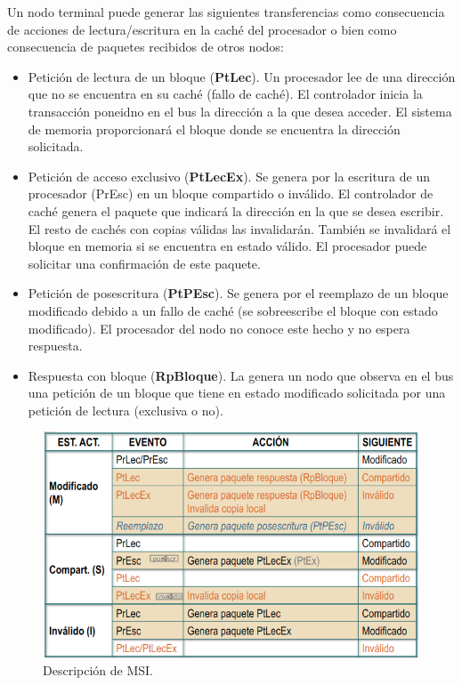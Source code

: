 \documentclass[12pt,spanish]{article}
\begin{document}
Un nodo terminal puede generar las siguientes transferencias como consecuencia de acciones de lectura/escritura en la caché del procesador o bien como consecuencia de paquetes recibidos de otros nodos:

\begin{itemize}
	\item Petición de lectura de un bloque (\textbf{PtLec}). Un procesador lee de una dirección que no se encuentra en su caché (fallo de caché). El controlador inicia la transacción poneidno en el bus la dirección a la que desea acceder. El sistema de memoria proporcionará el bloque donde se encuentra la dirección solicitada.
	\item Petición de acceso exclusivo (\textbf{PtLecEx}). Se genera por la escritura de un procesador (PrEsc) en un bloque compartido o inválido. El controlador de caché genera el paquete que indicará la dirección en la que se desea escribir. El resto de cachés con copias válidas las invalidarán. También se invalidará el bloque en memoria si se encuentra en estado válido. El procesador puede solicitar una confirmación de este paquete.
	\item Petición de posescritura (\textbf{PtPEsc}). Se genera por el reemplazo de un bloque modificado debido a un fallo de caché (se sobreescribe el bloque con estado modificado). El procesador del nodo no conoce este hecho y no espera respuesta.
	\item Respuesta con bloque (\textbf{RpBloque}). La genera un nodo que observa en el bus una petición de un bloque que tiene en estado modificado solicitada por una petición de lectura (exclusiva o no).
\end{itemize}

\begin{figure}[H]
\centering
\includegraphics[scale=0.75]{msi.png}
\caption{Descripción de MSI.}
\end{figure}
\end{document}

